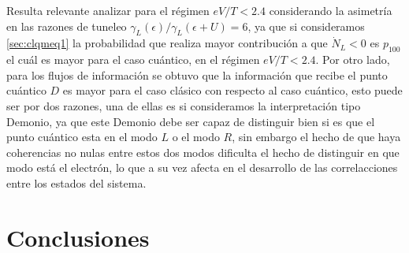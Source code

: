 



Resulta relevante analizar para el régimen $eV/T<2.4$ considerando la asimetría en las razones de tuneleo $\gamma_{L}(\epsilon)/\gamma_{L}(\epsilon + U) = 6$, ya que si consideramos \ref{sec:clqmeq1} la probabilidad que realiza mayor contribución a que $\dot{N}_{L}<0$ es $p_{100}$ el cuál es mayor para el caso cuántico, en el régimen $eV/T<2.4$. Por otro lado, para los flujos de información se obtuvo que la información que recibe el punto cuántico $D$ es mayor para el caso clásico con respecto al caso cuántico, esto puede ser por dos razones, una de ellas es si consideramos la interpretación tipo Demonio, ya que este Demonio debe ser capaz de distinguir bien si es que el punto cuántico esta en el modo $L$ o el modo $R$, sin embargo el hecho de que haya coherencias no nulas entre estos dos modos dificulta el hecho de distinguir en que modo está el electrón, lo que a su vez afecta en el desarrollo de las correlacciones entre los estados del sistema. 



\label{sec5:demonio}


\chapter{Conclusiones}







